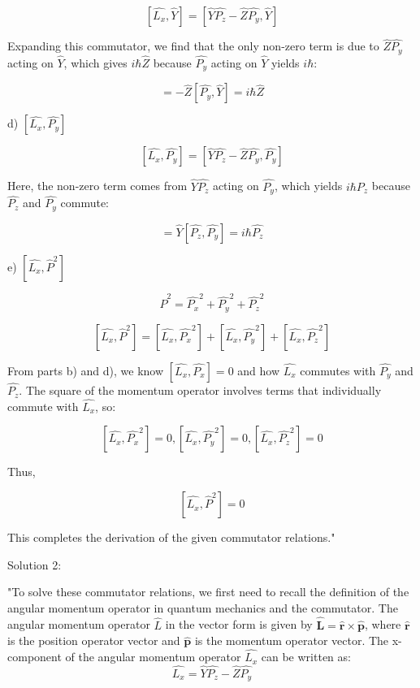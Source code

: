 \[ \left[ \hat{L_{x}}, \hat{Y} \right] = \left[ \hat{Y}\hat{P_{z}} - \hat{Z}\hat{P_{y}}, \hat{Y} \right] \]

Expanding this commutator, we find that the only non-zero term is due to \( \hat{Z}\hat{P_{y}} \) acting on \( \hat{Y} \), which gives \( i\hbar\hat{Z} \) because \( \hat{P_{y}} \) acting on \( \hat{Y} \) yields \( i\hbar \):

\[ = - \hat{Z} [ \hat{P_{y}}, \hat{Y} ] = i\hbar \hat{Z} \]

d) \( \left[ \hat{L_{x}}, \hat{P_{y}} \right] \)

\[ \left[ \hat{L_{x}}, \hat{P_{y}} \right] = \left[ \hat{Y}\hat{P_{z}} - \hat{Z}\hat{P_{y}}, \hat{P_{y}} \right] \]

Here, the non-zero term comes from \( \hat{Y}\hat{P_{z}} \) acting on \( \hat{P_{y}} \), which yields \( i\hbar\hat{P_{z}} \) because \( \hat{P_{z}} \) and \( \hat{P_{y}} \) commute:

\[ = \hat{Y} [ \hat{P_{z}}, \hat{P_{y}} ] = i\hbar \hat{P_{z}} \]

e) \( \left[ \hat{L_{x}}, \hat{P}^{2} \right] \)

\[ \hat{P}^{2} = \hat{P_{x}}^2 + \hat{P_{y}}^2 + \hat{P_{z}}^2 \]

\[ \left[ \hat{L_{x}}, \hat{P}^{2} \right] = \left[ \hat{L_{x}}, \hat{P_{x}}^2 \right] + \left[ \hat{L_{x}}, \hat{P_{y}}^2 \right] + \left[ \hat{L_{x}}, \hat{P_{z}}^2 \right] \]

From parts b) and d), we know \( \left[ \hat{L_{x}}, \hat{P_{x}} \right] = 0 \) and how \( \hat{L_{x}} \) commutes with \( \hat{P_{y}} \) and \( \hat{P_{z}} \). The square of the momentum operator involves terms that individually commute with \( \hat{L_{x}} \), so:

\[ \left[ \hat{L_{x}}, \hat{P_{x}}^2 \right] = 0, \left[ \hat{L_{x}}, \hat{P_{y}}^2 \right] = 0, \left[ \hat{L_{x}}, \hat{P_{z}}^2 \right] = 0 \]

Thus,

\[ \left[ \hat{L_{x}}, \hat{P}^{2} \right] = 0 \]

This completes the derivation of the given commutator relations."

Solution 2: 

"To solve these commutator relations, we first need to recall the definition of the angular momentum operator in quantum mechanics and the commutator. The angular momentum operator \( \hat{L} \) in the vector form is given by \( \hat{\mathbf{L}} = \hat{\mathbf{r}} \times \hat{\mathbf{p}} \), where \( \hat{\mathbf{r}} \) is the position operator vector and \( \hat{\mathbf{p}} \) is the momentum operator vector. The x-component of the angular momentum operator \( \hat{L_{x}} \) can be written as:
\[ \hat{L_{x}} = \hat{Y}\hat{P_{z}} - \hat{Z}\hat{P_{y}} \]

